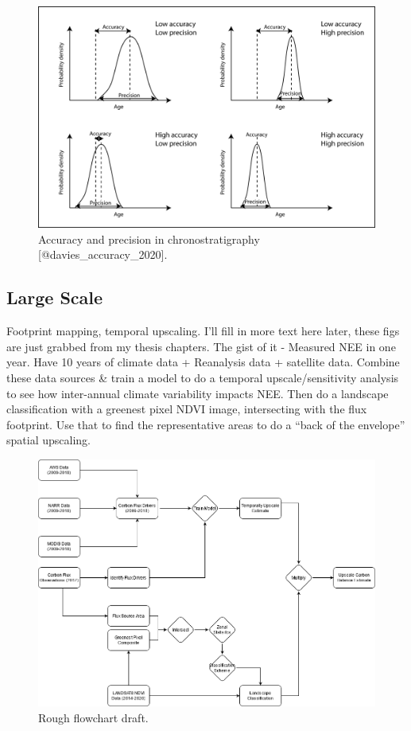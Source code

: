 \documentclass[
]{book}
\begin{document}
\begin{figure}
\includegraphics[width=1\linewidth]{images/16-accuracy-vs-precision2} \caption{Accuracy and precision in chronostratigraphy [@davies_accuracy_2020].}\label{fig:16-accuracy-vs-precision2}
\end{figure}

\hypertarget{large-scale}{%
\subsection{Large Scale}\label{large-scale}}

Footprint mapping, temporal upscaling. I'll fill in more text here later, these figs are just grabbed from my thesis chapters. The gist of it - Measured NEE in one year. Have 10 years of climate data + Reanalysis data + satellite data. Combine these data sources \& train a model to do a temporal upscale/sensitivity analysis to see how inter-annual climate variability impacts NEE. Then do a landscape classification with a greenest pixel NDVI image, intersecting with the flux footprint. Use that to find the representative areas to do a ``back of the envelope'' spatial upscaling.

\begin{figure}
\includegraphics[width=1\linewidth]{images/16-flux-upscaling-estimate} \caption{Rough flowchart draft.}\label{fig:16-16-flux-upscaling-estimate}
\end{figure}
\end{document}
